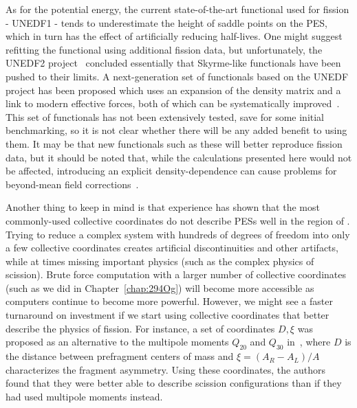 As for the potential energy, the current state-of-the-art functional used for fission - UNEDF1 - tends to underestimate the height of saddle points on the PES, which in turn has the effect of artificially reducing half-lives. One might suggest refitting the functional using additional fission data, but unfortunately, the UNEDF2 project~\cite{Kortelainen2014} concluded essentially that Skyrme-like functionals have been pushed to their limits. A next-generation set of functionals based on the UNEDF project has been proposed which uses an expansion of the density matrix and a link to modern effective forces, both of which can be systematically improved~\cite{NavarroPerez2018}. This set of functionals has not been extensively tested, save for some initial benchmarking, so it is not clear whether there will be any added benefit to using them. It may be that new functionals such as these will better reproduce fission data, but it should be noted that, while the calculations presented here would not be affected, introducing an explicit density-dependence can cause problems for beyond-mean field corrections~\cite{duguet2009, dobaczewski2007, anguiano2001}. %

Another thing to keep in mind is that experience has shown that the most commonly-used collective coordinates do not describe PESs well in the region of {\Pt}. Trying to reduce a complex system with hundreds of degrees of freedom into only a few collective coordinates creates artificial discontinuities and other artifacts, while at times missing important physics (such as the complex physics of scission). Brute force computation with a larger number of collective coordinates (such as we did in Chapter~\ref{chap:294Og}) will become more accessible as computers continue to become more powerful. However, we might see a faster turnaround on investment if we start using collective coordinates that better describe the physics of fission. For instance, a set of coordinates $D, \xi$ was proposed as an alternative to the multipole moments $Q_{20}$ and $Q_{30}$ in~\cite{younes2012}, where $D$ is the distance between prefragment centers of mass and $\xi = (A_R-A_L)/A$ characterizes the fragment asymmetry. Using these coordinates, the authors found that they were better able to describe scission configurations than if they had used multipole moments instead. %

